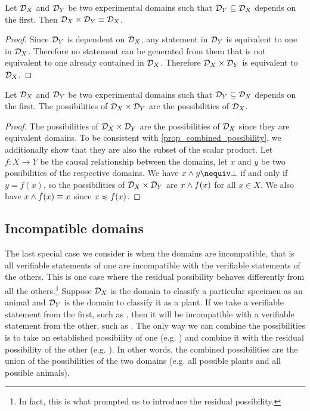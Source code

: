 \documentclass[11pt,letterpaper,fleqn]{memoir} %
\begin{document}
\begin{mathSection}
	\begin{prop}
		Let $\mathcal{D}_X$ and $\mathcal{D}_Y$ be two experimental domains such that $\mathcal{D}_Y \subseteq \mathcal{D}_X$ depends on the first. Then $\mathcal{D}_X \times \mathcal{D}_Y \equiv \mathcal{D}_X$.
	\end{prop}
	\begin{proof}
		Since $\mathcal{D}_Y$ is dependent on $\mathcal{D}_X$, any statement in $\mathcal{D}_Y$ is equivalent to one in $\mathcal{D}_X$. Therefore no statement can be generated from them that is not equivalent to one already contained in $\mathcal{D}_X$. Therefore $\mathcal{D}_X \times \mathcal{D}_Y$ is equivalent to $\mathcal{D}_X$. 
	\end{proof}
	\begin{coro}
		Let $\mathcal{D}_X$ and $\mathcal{D}_Y$ be two experimental domains such that $\mathcal{D}_Y \subseteq \mathcal{D}_X$ depends on the first. The possibilities of $\mathcal{D}_X \times \mathcal{D}_Y$ are the possibilities of $\mathcal{D}_X$.
	\end{coro}
	\begin{proof}
		The possibilities of $\mathcal{D}_X \times \mathcal{D}_Y$ are the possibilities of $\mathcal{D}_X$ since they are equivalent domains. To be consistent with \ref{prop_combined_possibility}, we additionally show that they are also the subset of the scalar product. Let $f : X \to Y$ be the causal relationship between the domains, let $x$ and $y$ be two possibilities of the respective domains. We have $x \AND y \nequiv \impossibility$ if and only if $y = f(x)$, so the possibilities of $\mathcal{D}_X \times \mathcal{D}_Y$ are $x \wedge f(x)$ for all $x \in X$. We also have $x \wedge f(x) \equiv x$ since $x \preccurlyeq f(x)$.
	\end{proof}
\end{mathSection}


\subsection{Incompatible domains}

The last special case we consider is when the domains are incompatible, that is all verifiable statements of one are incompatible with the verifiable statements of the others. This is one case where the residual possibility behaves differently from all the others.\footnote{In fact, this is what prompted us to introduce the residual possibility.} Suppose $\mathcal{D}_X$ is the domain to classify a particular specimen as an animal and $\mathcal{D}_Y$ is the domain to classify it as a plant. If we take a verifiable statement from the first, such as , then it will be incompatible with a verifiable statement from the other, such as . The only way we can combine the possibilities is to take an established possibility of one (e.g. ) and combine it with the residual possibility of the other (e.g. ). In other words, the combined possibilities are the union of the possibilities of the two domains (e.g. all possible plants and all possible animals).
\end{document}
